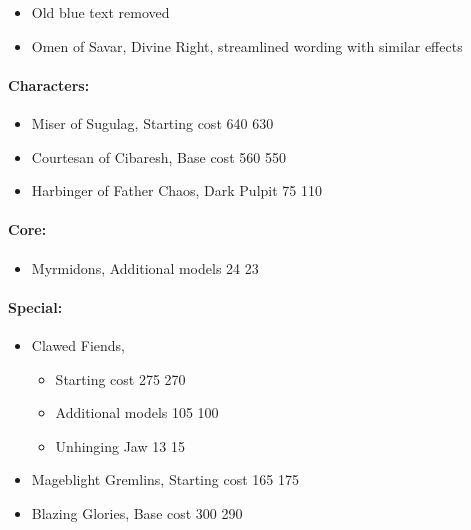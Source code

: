 

\subtitle{2.4}

\begin{itemize}
	\item Old blue text removed
	\item Omen of Savar, Divine Right, streamlined wording with similar effects
\end{itemize}


\begin{multicols}{2}
\paragraph{Characters:}
\begin{itemize}
	\item Miser of Sugulag, Starting cost 640 \costdown{} 630
	\item Courtesan of Cibaresh, Base cost 560 \costdown{} 550
	\item Harbinger of Father Chaos, Dark Pulpit 75 \costup{} 110
\end{itemize}
\paragraph{Core:}
\begin{itemize}
	\item Myrmidons, Additional models 24 \costdown{} 23
\end{itemize}
\columnbreak
\paragraph{Special:}
\begin{itemize}
	\item Clawed Fiends,
	\begin{itemize}
		\item Starting cost 275 \costdown{} 270
		\item Additional models 105 \costdown{} 100
		\item Unhinging Jaw 13\costup{} 15
	\end{itemize}
	\item Mageblight Gremlins, Starting cost 165 \costup{} 175
	\item Blazing Glories, Base cost 300 \costdown{} 290
\end{itemize}
\end{multicols}

\subtitle{2.3.2}

